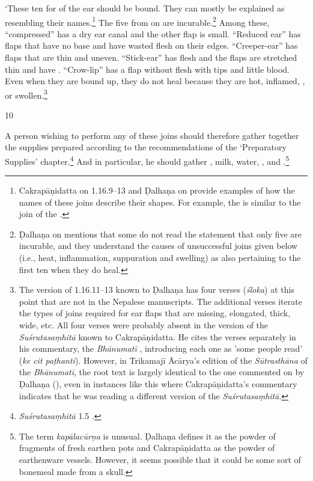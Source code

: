 \begin{translation}
    `These ten  for  of the ear should be
    bound.  They can mostly be explained as resembling their names.\footnote{Cakrapāṇidatta on 1.16.9–13 \citep[128–129]{acar-1939} and Ḍalhaṇa on  provide examples of how the names of these joins describe their shapes. For example, the  is similar to the join of the .}  The five from  on are incurable.\footnote{Ḍalhaṇa on  mentions that some do not read the statement that only five are incurable, and they understand the causes of unsuccessful joins given below (i.e., heat, inflammation, suppuration and swelling) as also pertaining to the first ten when they do heal.}  Among these, “compressed” has a dry ear canal and the other flap is small.   “Reduced ear” has 
    flaps that have no base and have wasted flesh on their edges. “Creeper-ear” has 
    flaps that are thin and uneven. “Stick-ear” has  flesh and the 
    flaps are stretched thin and have  .  “Crow-lip” 
    has a flap 
    without flesh with  tips and little blood. Even when 
    they are bound up, they do not heal because they are hot, inflamed, 
    , or swollen.\footnote{The version of 1.16.11–13 known to Ḍalhaṇa \citep[78]{vulgate} has four verses (\emph{śloka}) at this point that are not in the Nepalese manuscripts. The additional verses iterate the types of joins required for ear flaps that are missing, elongated, thick, wide, etc. All four verses were probably absent in the version of the \emph{Suśrutasaṃhitā} known to Cakrapāṇidatta. He cites the verses separately in his commentary, the \emph{Bhānumatī} \citep[128–129]{acar-1939}, introducing each one as 'some people read' (\emph{ke cit paṭhanti}). However,  in Trikamajī Ācārya's edition of the \emph{Sūtrasthāna} of the \emph{Bhānumatī}, the root text is largely identical to the one commented on by Ḍalhaṇa (\cite{vulgate}), even in instances like this where Cakrapāṇidatta's commentary indicates that he was reading a different version of the \emph{Suśrutasaṃhitā}.}
    
    \item[10]  
    
    A person wishing to perform any of these joins should therefore gather together the
    supplies prepared according to the recommendations of the `Preparatory
    Supplies' chapter.\footnote{\emph{Suśrutasaṃhitā} 1.5 \citep[18–23]{vulgate}.}  And in particular, he should gather
    , milk, water,
    , and .\footnote{The term \emph{kapālacūrṇa} is unusual. Ḍalhaṇa \citep[79]{vulgate} defines it as the powder of fragments of fresh earthen pots and Cakrapāṇidatta \citep[129]{acar-1939} as the powder of earthenware vessels. However, it seems possible that it could be some sort of bonemeal made from a skull.}  
    

\end{translation}
